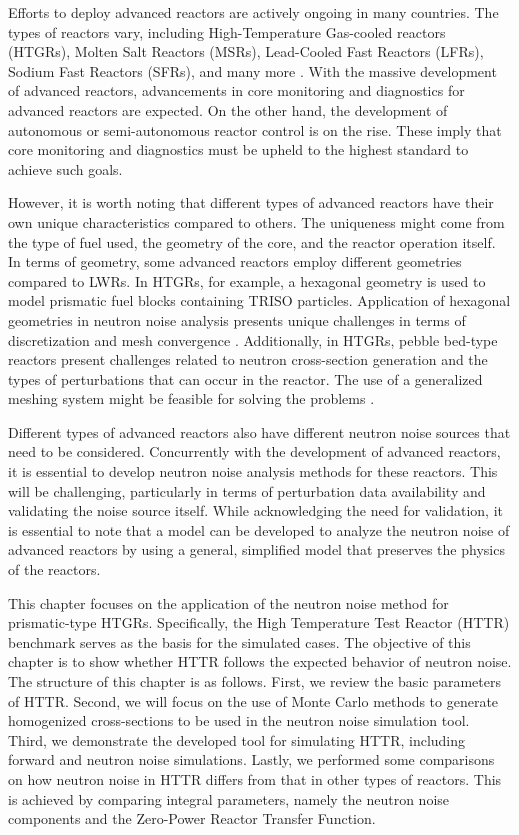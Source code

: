 \label{ch:noise_HTTR}

Efforts to deploy advanced reactors are actively ongoing in many countries. The types of reactors vary, including High-Temperature Gas-cooled reactors (HTGRs), Molten Salt Reactors (MSRs), Lead-Cooled Fast Reactors (LFRs), Sodium Fast Reactors (SFRs), and many more \cite{pioroHandbookGenerationIV2016}. With the massive development of advanced reactors, advancements in core monitoring and diagnostics for advanced reactors are expected. On the other hand, the development of autonomous or semi-autonomous reactor control is on the rise. These imply that core monitoring and diagnostics must be upheld to the highest standard to achieve such goals.

However, it is worth noting that different types of advanced reactors have their own unique characteristics compared to others. The uniqueness might come from the type of fuel used, the geometry of the core, and the reactor operation itself. In terms of geometry, some advanced reactors employ different geometries compared to LWRs. In HTGRs, for example, a hexagonal geometry is used to model prismatic fuel blocks containing TRISO particles. Application of hexagonal geometries in neutron noise analysis presents unique challenges in terms of discretization and mesh convergence \cite{tranNeutronNoiseCalculations2013}. Additionally, in HTGRs, pebble bed-type reactors present challenges related to neutron cross-section generation and the types of perturbations that can occur in the reactor. The use of a generalized meshing system might be feasible for solving the problems \cite{hosseiniDevelopment3DNeutron2016, vidal-ferrandizMovingMeshesSolve2016}. 

Different types of advanced reactors also have different neutron noise sources that need to be considered. Concurrently with the development of advanced reactors, it is essential to develop neutron noise analysis methods for these reactors. This will be challenging, particularly in terms of perturbation data availability and validating the noise source itself. While acknowledging the need for validation, it is essential to note that a model can be developed to analyze the neutron noise of advanced reactors by using a general, simplified model that preserves the physics of the reactors.

This chapter focuses on the application of the neutron noise method for prismatic-type HTGRs. Specifically, the High Temperature Test Reactor (HTTR) benchmark serves as the basis for the simulated cases. The objective of this chapter is to show whether HTTR follows the expected behavior of neutron noise. The structure of this chapter is as follows. First, we review the basic parameters of HTTR. Second, we will focus on the use of Monte Carlo methods to generate homogenized cross-sections to be used in the neutron noise simulation tool. Third, we demonstrate the developed tool for simulating HTTR, including forward and neutron noise simulations. Lastly, we performed some comparisons on how neutron noise in HTTR differs from that in other types of reactors. This is achieved by comparing integral parameters, namely the neutron noise components and the Zero-Power Reactor Transfer Function.

